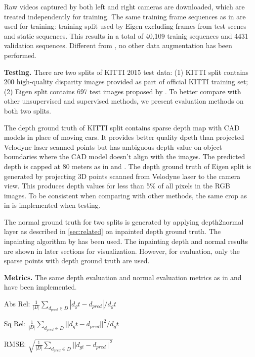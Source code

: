 Raw videos captured by both left and right cameras are downloaded, which are treated independently for training. The same training frame sequences as in \cite{zhou2017unsupervised} are used for training: training split used by Eigen \etal  \cite{eigen2014depth} excluding frames from test scenes and static sequences. This results in a total of 40,109 trainig sequences and 4431 validation sequences. Different from \cite{godard2016unsupervised}, no other data augmentation has been performed.

\textbf{Testing.} 
There are two splits of KITTI 2015 test data: (1) KITTI split contains 200 high-quality disparity images provided as part of official KITTI training set; (2) Eigen split contains 697 test images proposed by \cite{eigen2014depth}. To better compare with other unsupervised and supervised methods, we present evaluation methods on both two splits. 

The depth ground truth of KITTI split contains sparse depth map with CAD models in place of moving cars. It provides better quality dpeth than projected Velodyne laser scanned points but has ambiguous depth value on object boundaries where the CAD model doesn't align with the images. The predicted depth is capped at 80 meters as in \cite{godard2016unsupervised} and \cite{zhou2017unsupervised}. The depth ground truth of Eigen split is generated by projecting 3D points scanned from Velodyne laser to the camera view. This produces depth values for less than 5\% of all pixels in the RGB images. To be consistent when comparing with other methods, the same crop as in \cite{eigen2014depth} is implemented when testing.

The normal ground truth for two splits is generated by applying depth2normal layer as described in \ref{sec:related} on inpainted depth ground truth. The inpainting algorithm by \cite{silberman2012indoor} has been used. The inpainting depth and normal results are shown in later sections for visualization. However, for evaluation, only the sparse points with depth ground truth are used.

\textbf{Metrics.} The same depth evaluation and normal evaluation metrics as in \cite{eigen2014depth} and \cite{eigen2015predicting} have been implemented.

Abs Rel: $\frac{1}{|D|}\sum_{d_{pred}\in D}|d_gt - d_{pred}|/d_gt$

Sq Rel: $\frac{1}{|D|}\sum_{d_{pred}\in D}||d_gt - d_{pred}||^2/d_gt$

RMSE: $\sqrt{\frac{1}{|D|}\sum_{d_{pred}\in D}||d_{gt} - d_{pred}||^2}$

